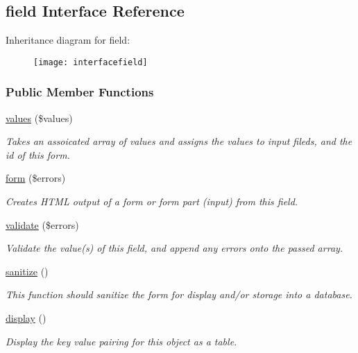 \hypertarget{interfacefield}{\subsection{field Interface Reference}
\label{interfacefield}
}
Inheritance diagram for field\-:\begin{figure}[H]
\begin{center}
\leavevmode
\texttt{[image: interfacefield]}
\end{center}
\end{figure}
\subsubsection*{Public Member Functions}
\begin{DoxyCompactItemize}
\item 
\hyperlink{interfacefield_a54958a09bc0dcd947d611b14741c5996}{values} (\$values)
\begin{DoxyCompactList}\small\item\em Takes an assoicated array of values and assigns the values to input fileds, and the id of this form. \end{DoxyCompactList}\item 
\hyperlink{interfacefield_a1b51c4b8b01f77a26eda359e1fc0fb4c}{form} (\$errors)
\begin{DoxyCompactList}\small\item\em Creates H\-T\-M\-L output of a form or form part (input) from this field. \end{DoxyCompactList}\item 
\hyperlink{interfacefield_a352b92f9e8dce69191bad79bdc5d972b}{validate} (\$errors)
\begin{DoxyCompactList}\small\item\em Validate the value(s) of this field, and append any errors onto the passed array. \end{DoxyCompactList}\item 
\hyperlink{interfacefield_a3ed132df10731b5ebe33acc44ac03c85}{sanitize} ()
\begin{DoxyCompactList}\small\item\em This function should sanitize the form for display and/or storage into a database. \end{DoxyCompactList}\item 
\hyperlink{interfacefield_a6a8bbd656a0e7cab2604f6df859bb60a}{display} ()
\begin{DoxyCompactList}\small\item\em Display the key value pairing for this object as a table. \end{DoxyCompactList}\end{DoxyCompactItemize}


